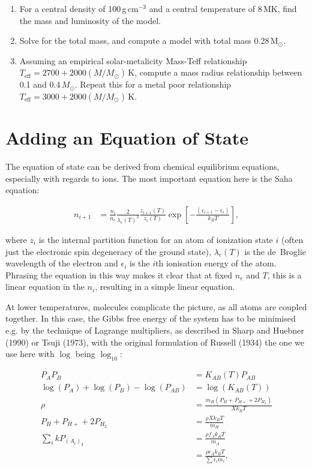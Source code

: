 \documentclass[12pt]{article}
\begin{document}
\begin{enumerate}
\item For a central density of 100\,g\,cm$^{-3}$ and a central temperature of 8\,MK, find the mass and luminosity of the model.

\item Solve for the total mass, and compute a model with total mass 0.28\,M$_\odot$.

\item Assuming an empirical solar-metalicity Mass-Teff relationship $T_\text{eff} = 2700 + 2000(M/M_\odot)$\,K, compute a mass radius relationship between 0.1 and 0.4\,$M_\odot$. Repeat this for a metal poor relationship $T_\text{eff} = 3000 + 2000(M/M_\odot)$\,K.
\end{enumerate}

\section{Adding an Equation of State}

The equation of state can be derived from chemical equilibrium equations, especially with regards to ions. The most important equation here is the Saha equation:

\begin{align}
n_{i+1} &= \frac{n_i}{n_e} \frac{2}{\lambda_e(T)^3} \frac{z_{i+1}(T)}{z_i(T)} \exp \left[ - \frac{(\epsilon_{i+1} - \epsilon_i)}{k_B T} \right],
\end{align}

where $z_i$ is the internal partition function for an atom of ionization state $i$ (often just the electronic spin degeneracy of the ground state), $\lambda_e(T)$ is the de~Broglie wavelength of the electron and $\epsilon_i$ is the $i$th ionisation energy of the atom. Phrasing the equation in this way makes it clear that at fixed $n_e$ and $T$, this is a linear equation in the $n_i$, resulting in a simple linear equation.

At lower temperatures, molecules complicate the picture, as all atoms are coupled together.  In this case, the Gibbs free energy of the system has to be minimised e.g. by the technique of Lagrange multipliers, as described in Sharp and Huebner (1990) or Tsuji (1973), with the original formulation of Russell (1934) the one we use here with $\log$ being $\log_{10}$:

\begin{align}
P_A P_B &= K_{AB}(T)P_{AB}\\
\log(P_A) + \log(P_B) - \log(P_{AB})&= \log(K_{AB}(T))\\
\rho &= \frac{m_H(P_H + P_{H+} + 2P_{H_2})}{X k_B T}\\
P_H + P_{H+} + 2P_{H_2} &= \frac{\rho X k_B T}{m_H}\\
\sum_i k P_{(A_i)_k} &= \frac{\rho f_A k_B T}{m_A}\\
&= \frac{\rho \epsilon_A k_B T}{\sum \epsilon_i m_i},
\end{align}
\end{document}
